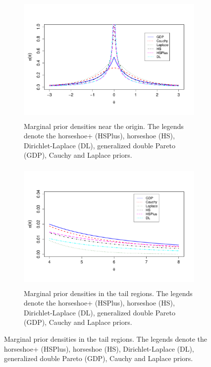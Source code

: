 \documentclass[11pt]{article}
\numberwithin{equation}{section}
\begin{document}
\begin{figure}[ht!]
  \begin{subfigure}{0.45\linewidth}
	\includegraphics[height=2.5in,width=\textwidth]{figs/densities_zero_new}%
	\caption{\footnotesize{Marginal prior densities near the origin. The legends denote the horseshoe+ (HSPlus), horseshoe (HS), Dirichlet-Laplace (DL), generalized double Pareto (GDP), Cauchy and Laplace priors.}}
	\label{fig:zero}
	\end{subfigure}
	\hspace{0.1in}
  \begin{subfigure}{0.45\linewidth}
	\includegraphics[height=2.5in,width=\textwidth]{figs/densities_tails_new}
 	 \caption{\footnotesize{Marginal prior densities in the tail regions. The legends denote the horseshoe+ (HSPlus), horseshoe (HS), Dirichlet-Laplace (DL), generalized double Pareto (GDP), Cauchy and Laplace priors.}}
  \label{fig:tails}
		\end{subfigure}
\end{figure}
\end{document}
